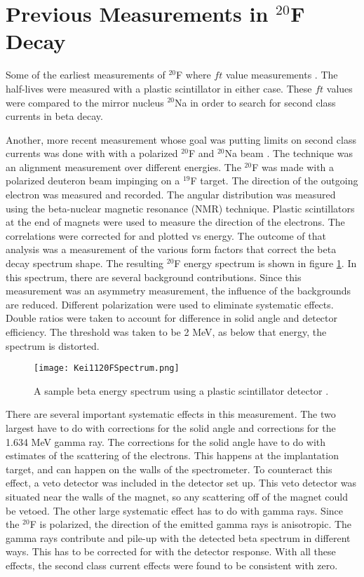 \documentclass[../MaxHughesThesis.tex]{subfiles}
\begin{document}
\section{Previous Measurements in $^{20}$F Decay}

Some of the earliest measurements of $^{20}$F where $ft$ value measurements \cite{Wil70} \cite{Alb75}.
The half-lives were measured with a plastic scintillator in either case.  
These $ft$ values were compared to the mirror nucleus $^{20}$Na in order to search for second class currents in beta decay. 

Another, more recent measurement whose goal was putting limits on second class currents was done with with a polarized $^{20}$F and $^{20}$Na beam \cite{Min11}.
The technique was an alignment measurement over different energies.
The $^{20}$F was made with a polarized deuteron beam impinging on a $^{19}$F target. 
The direction of the outgoing electron was measured and recorded.
The angular distribution was measured using the beta-nuclear magnetic resonance (NMR) technique.
Plastic scintillators at the end of magnets were used to measure the direction of the electrons.
The correlations were corrected for and plotted vs energy.
The outcome of that analysis was a measurement of the various form factors that correct the beta decay spectrum shape. 
The resulting $^{20}$F energy spectrum is shown in figure \ref{fig:keispec}.
In this spectrum, there are several background contributions. 
Since this measurement  was an asymmetry measurement, the influence of the backgrounds are reduced. 
Different polarization were used to eliminate systematic effects.
Double ratios were taken to account for difference in solid angle and detector efficiency.
The threshold was taken to be 2 MeV, as below that energy, the spectrum is distorted.

\begin{figure}[!htb]
	\centerline{\texttt{[image: Kei1120FSpectrum.png]}}
	\caption{A sample beta energy spectrum using a plastic scintillator detector \cite{Min11}.}
	\label{fig:keispec}
\end{figure}

There are several important systematic effects in this measurement.
The two largest have to do with corrections for the solid angle and corrections for the 1.634 MeV gamma ray.
The corrections for the solid angle have to do with estimates of the scattering of the electrons.
This happens at the implantation target, and can happen on the walls of the spectrometer.
To counteract this effect, a veto detector was included in the detector set up. 
This veto detector was situated near the walls of the magnet, so any scattering off of the magnet could be vetoed. 
The other large systematic effect has to do with gamma rays.
Since the $^{20}$F is polarized, the direction of the emitted gamma rays is anisotropic.
The gamma rays contribute and pile-up with the detected beta spectrum in different ways.
This has to be corrected for with the detector response.
With all these effects, the second class current effects were found to be consistent with zero.   
\end{document}
